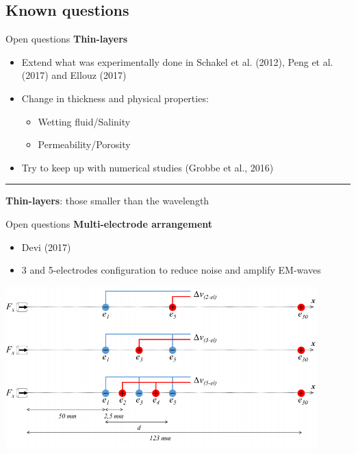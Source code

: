 \documentclass[utf8]{beamer} \usetheme{lfcr} %
\begin{document}
\subsection{Known questions}
\begin{frame}{Open questions}
  {\textbf{Thin-layers}}
  \begin{center}
  \begin{itemize}
    \item Extend what was experimentally done in Schakel et al. (2012), Peng et al. (2017) and Ellouz (2017)
    \item {Change in thickness and physical properties:
      \begin{itemize}
        \item Wetting fluid/Salinity
        \item Permeability/Porosity
      \end{itemize}
      }
      \item Try to keep up with numerical studies (Grobbe et al., 2016)
  \end{itemize}

  \rule{\textwidth}{1pt}

  \textbf{Thin-layers}: those smaller than the wavelength
  \end{center}
\end{frame}
%
\begin{frame}{Open questions}
  {\textbf{Multi-electrode arrangement}}

  \begin{itemize}
    \item Devi (2017)
      \item 3 and 5-electrodes configuration to reduce noise and amplify EM-waves
  \end{itemize}

  \vspace*{4cm}
  \includegraphics[width=0.9\textwidth]{Devimultielectrode.png}
\end{frame}
\end{document}
